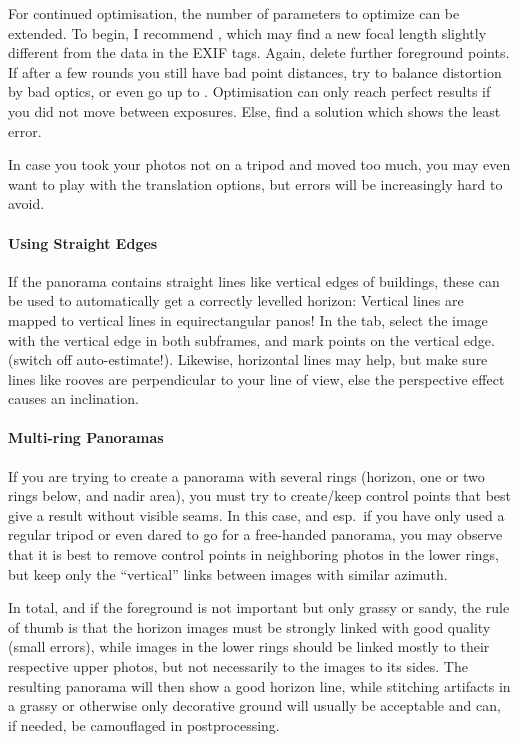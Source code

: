 For continued optimisation, the number of parameters to optimize can
be extended. To begin, I recommend , which may find a new focal length slightly different from
the data in the EXIF tags. Again, delete further foreground points. If
after a few rounds you still have bad point distances, try
 to balance
distortion by bad optics, or even go up to .  Optimisation can only reach perfect results if you
did not move between exposures. Else, find a solution which shows the
least error.

In case you took your photos not on a tripod and moved too much, you
may even want to play with the translation options, but errors will be
increasingly hard to avoid.

\paragraph{Using Straight Edges}
If the panorama contains straight lines like vertical edges of
buildings, these can be used to automatically get a correctly levelled
horizon: Vertical lines are mapped to vertical lines in
equirectangular panos! In the  tab, select the image
with the vertical edge in both subframes, and mark points on the
vertical edge. (switch off auto-estimate!). 
Likewise, horizontal lines may help, but make sure lines like rooves
are perpendicular to your line of view, else the perspective effect
causes an inclination.

\paragraph{Multi-ring Panoramas}
If you are trying to create a panorama with several rings (horizon,
one or two rings below, and nadir area), you must try to create/keep control
points that best give a result without visible seams. In this case,
and esp.\ if you have only used a regular tripod or even dared to go
for a free-handed panorama, you may observe that it is best to remove
control points in neighboring photos in the lower rings, but keep only
the ``vertical'' links between images with similar azimuth.

In total, and if the foreground is not important but only grassy or
sandy, the rule of thumb is that the horizon images must be strongly
linked with good quality (small errors), while images in the lower
rings should be linked mostly to their respective upper photos, but
not necessarily to the  images to its sides. The resulting panorama will then
show a good horizon line, while stitching artifacts in a grassy or
otherwise only decorative ground will usually be acceptable and can,
if needed, be camouflaged in postprocessing.

